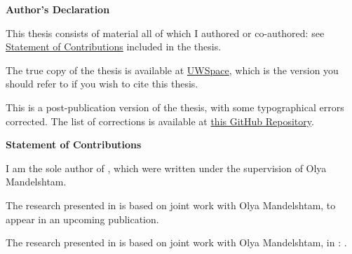 
{\large
{}
\begin{center}\textbf{Author's Declaration}\end{center}

This thesis consists of material all of which I authored or co-authored: see \hyperref[sec:contributions]{Statement of Contributions} included in the thesis.

The true copy of the thesis is available at \href{https://uwspace.uwaterloo.ca/handle/10012/22733}{UWSpace},
which is the version you should refer to if you wish to cite this thesis.

This is a post-publication version of the thesis, with some typographical errors corrected.
The list of corrections is available at \href{https://github.com/ZeusDM/mmath-thesis/tree/main}{this GitHub Repository}.

}

\clearpage
{}

\label{sec:contributions}

{\large
{}
\begin{center}\textbf{Statement of Contributions}\end{center}

I am the sole author of , which were written under the supervision of Olya Mandelshtam.

The research presented in  is based on joint work with Olya Mandelshtam, to appear in an upcoming publication.

The research presented in  is based on joint work with Olya Mandelshtam, in \cite{DM25}:
.

}

\clearpage
{}


